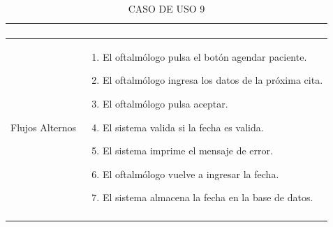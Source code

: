 \documentclass[10pt]{article}
\begin{document}
\begin{longtable}{|p{3.8cm}|p{10.8cm}|}
\begin{enumerate}
\end{enumerate}
    \\
\hline
Flujos Alternos & \begin{enumerate}
    \item El oftalmólogo pulsa el botón agendar paciente.
    \item El oftalmólogo ingresa los datos de la próxima cita.
    \item El oftalmólogo pulsa aceptar.
    \item El sistema valida si la fecha es valida.
    \item El sistema imprime el mensaje de error.
    \item El oftalmólogo vuelve a ingresar la fecha.
    \item El sistema almacena la fecha en la base de datos.
\end{enumerate}
    \\
\hline
\caption{CASO DE USO 9}
\label{tabla1}
\end{longtable}

\newpage 
\end{document}
